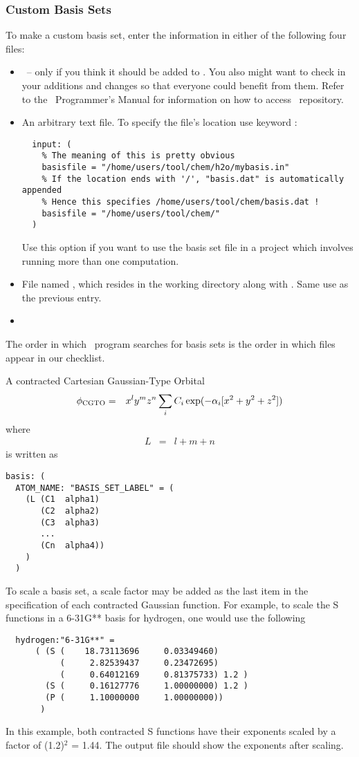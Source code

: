 \subsubsection{Custom Basis Sets}
To make a custom basis set, enter the information in either of the
following four files:
\begin{itemize}
\item \pbasisdat\ -- only if you think it should be added to \PSIthree. 
You also might want to check in your additions and changes so that
everyone could benefit from them. Refer to the \PSIthree\ Programmer's
Manual for information on how to access \PSIthree\ repository.
\item An arbitrary text file. To specify the file's location use keyword
:
\begin{verbatim}
  input: (
    % The meaning of this is pretty obvious
    basisfile = "/home/users/tool/chem/h2o/mybasis.in"
    % If the location ends with '/', "basis.dat" is automatically appended
    % Hence this specifies /home/users/tool/chem/basis.dat !
    basisfile = "/home/users/tool/chem/"
  )
\end{verbatim}
Use this option if you want to use the basis set file in a project
which involves running more than one computation.
\item File named \basisdat, which resides in the working directory along 
with  .  Same use as the previous entry.
\item {}
\end{itemize}
The order in which \PSIinput\ program searches for basis sets is the order 
in which files appear in our checklist.

A contracted Cartesian Gaussian-Type Orbital
\begin{eqnarray}
\phi_{\rm CGTO} & = & x^ly^mz^n\sum_i C_i \exp(-\alpha_i[x^2+y^2+z^2])
\end{eqnarray}
where
\begin{eqnarray}
L & = & l+m+n
\end{eqnarray}
is written as
\begin{verbatim}
basis: (
  ATOM_NAME: "BASIS_SET_LABEL" = (
    (L (C1  alpha1)
       (C2  alpha2)
       (C3  alpha3)
       ...
       (Cn  alpha4))   
    )
  )
\end{verbatim}

To scale a basis set, a scale factor may be added as the last item
in the specification of each contracted Gaussian function.  For
example, to scale the S functions in a 6-31G** basis for hydrogen,
one would use the following
\begin{verbatim}
  hydrogen:"6-31G**" =
      ( (S (    18.73113696     0.03349460)
           (     2.82539437     0.23472695)
           (     0.64012169     0.81375733) 1.2 )
        (S (     0.16127776     1.00000000) 1.2 )
        (P (     1.10000000     1.00000000))
       )
\end{verbatim}
In this example, both contracted S functions have their exponents
scaled by a factor of (1.2)$^2$ = 1.44.  The output file should show
the exponents after scaling.

